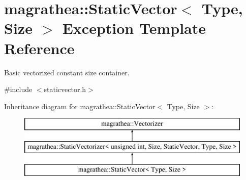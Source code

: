 \hypertarget{exceptionmagrathea_1_1StaticVector}{\section{magrathea\-:\-:Static\-Vector$<$ Type, Size $>$ Exception Template Reference}
\label{exceptionmagrathea_1_1StaticVector}
}


Basic vectorized constant size container.  




{\ttfamily \#include $<$staticvector.\-h$>$}

Inheritance diagram for magrathea\-:\-:Static\-Vector$<$ Type, Size $>$\-:\begin{figure}[H]
\begin{center}
\leavevmode
\includegraphics[height=3.000000cm]{exceptionmagrathea_1_1StaticVector}
\end{center}
\end{figure}
